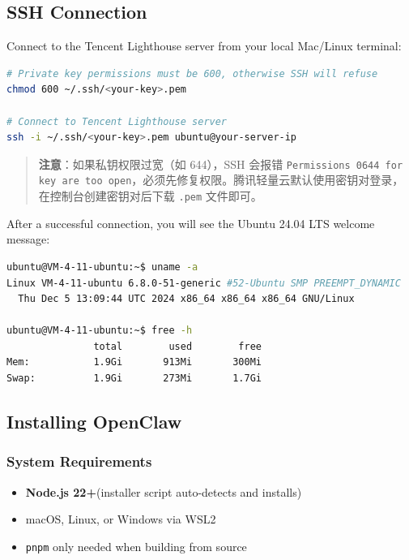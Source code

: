 \subsection{SSH Connection}


Connect to the Tencent Lighthouse server from your local Mac/Linux terminal:

\begin{lstlisting}[language=bash]
# Private key permissions must be 600, otherwise SSH will refuse
chmod 600 ~/.ssh/<your-key>.pem

# Connect to Tencent Lighthouse server
ssh -i ~/.ssh/<your-key>.pem ubuntu@your-server-ip
\end{lstlisting}

\begin{quote}
\textbf{注意}：如果私钥权限过宽（如 644），SSH 会报错 \texttt{Permissions 0644 for key are too open}，必须先修复权限。腾讯轻量云默认使用密钥对登录，在控制台创建密钥对后下载 \texttt{.pem} 文件即可。
\end{quote}

After a successful connection, you will see the Ubuntu 24.04 LTS welcome message:

\begin{lstlisting}[language=bash]
ubuntu@VM-4-11-ubuntu:~$ uname -a
Linux VM-4-11-ubuntu 6.8.0-51-generic #52-Ubuntu SMP PREEMPT_DYNAMIC
  Thu Dec 5 13:09:44 UTC 2024 x86_64 x86_64 x86_64 GNU/Linux

ubuntu@VM-4-11-ubuntu:~$ free -h
               total        used        free
Mem:           1.9Gi       913Mi       300Mi
Swap:          1.9Gi       273Mi       1.7Gi
\end{lstlisting}

\subsection{Installing OpenClaw}

\subsubsection{System Requirements}

\begin{itemize}
  \item \textbf{Node.js 22+}(installer script auto-detects and installs)
  \item macOS, Linux, or Windows via WSL2
  \item \texttt{pnpm} only needed when building from source
\end{itemize}

